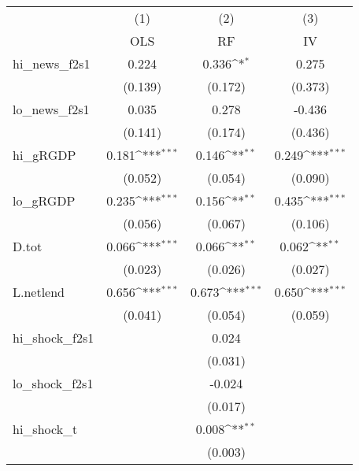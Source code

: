 {
\def\sym#1{\ifmmode^{#1}\else\(^{#1}\)\fi}
\begin{tabular}{l*{3}{c}}
\toprule
            &\multicolumn{1}{c}{(1)}&\multicolumn{1}{c}{(2)}&\multicolumn{1}{c}{(3)}\\
            &\multicolumn{1}{c}{OLS}&\multicolumn{1}{c}{RF}&\multicolumn{1}{c}{IV}\\
\midrule
hi\_news\_f2s1&       0.224         &       0.336\sym{*}  &       0.275         \\
            &     (0.139)         &     (0.172)         &     (0.373)         \\
\addlinespace
lo\_news\_f2s1&       0.035         &       0.278         &      -0.436         \\
            &     (0.141)         &     (0.174)         &     (0.436)         \\
\addlinespace
hi\_gRGDP    &       0.181\sym{***}&       0.146\sym{**} &       0.249\sym{***}\\
            &     (0.052)         &     (0.054)         &     (0.090)         \\
\addlinespace
lo\_gRGDP    &       0.235\sym{***}&       0.156\sym{**} &       0.435\sym{***}\\
            &     (0.056)         &     (0.067)         &     (0.106)         \\
\addlinespace
D.tot       &       0.066\sym{***}&       0.066\sym{**} &       0.062\sym{**} \\
            &     (0.023)         &     (0.026)         &     (0.027)         \\
\addlinespace
L.netlend   &       0.656\sym{***}&       0.673\sym{***}&       0.650\sym{***}\\
            &     (0.041)         &     (0.054)         &     (0.059)         \\
\addlinespace
hi\_shock\_f2s1&                     &       0.024         &                     \\
            &                     &     (0.031)         &                     \\
\addlinespace
lo\_shock\_f2s1&                     &      -0.024         &                     \\
            &                     &     (0.017)         &                     \\
\addlinespace
hi\_shock\_t  &                     &       0.008\sym{**} &                     \\
            &                     &     (0.003)         &                     \\

\end{tabular}}
